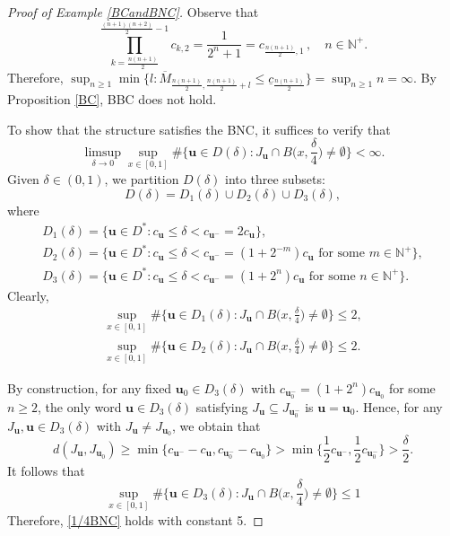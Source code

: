\documentclass[12pt]{amsart}
\numberwithin{equation}{section}
\theoremstyle{plain}
\theoremstyle{remark}
\theoremstyle{definition}
\newcommand{\om}{\overline{M}}
\newcommand{\N}{\mathbb{N}}
\newcommand{\bu}{\mathbf{u}}
\newcommand{\de}{\delta}
\newcommand{\f}{\frac}
\newcommand{\uc}{\underline{c}}
\renewcommand{\ge}{\geqslant}
\renewcommand{\le}{\leqslant}
\begin{document}
	
	\begin{proof}[Proof of Example \ref{BCandBNC}]
	Observe that
		\[
		\prod_{k=\f{n(n+1)}2}^{\f{(n+1)(n+2)}2-1}c_{k,2}=\f{1}{2^n+1}=c_{\f{n(n+1)}2,1}\,,\quad n\in \N^+.
		\]
		Therefore,
$\sup_{n\ge 1}\min  \{l:\om_{\f{n(n+1)}2,\f{n(n+1)}2+l}\le\uc_{\f{n(n+1)}2}\}=\sup_{n\ge 1} n=\infty.$ By Proposition \ref{BC}, BBC does not hold.
		
		To show that the structure satisfies the BNC, it suffices to verify that
		\begin{equation}\label{1/4BNC}
			\limsup_{\de\to 0}\sup_{x\in [0,1]}\# \Big\{\bu\in D(\de):J_{\bu}\cap B\big(x,\f\de4\big)\neq \emptyset \Big\}<\infty.
		\end{equation}
		Given $\de\in (0,1)$, we partition $D(\de)$ into three subsets:
		$$D(\de)=D_1(\de)\cup D_2(\de)\cup D_3(\de),$$ where
		\begin{gather*}
			D_1(\de)=\big\{\bu\in D^*:c_\bu\le \de<c_{\bu^-}=2c_\bu\big\},\\
			D_2(\de)=\big\{\bu\in D^*:c_\bu\le \de<c_{\bu^-}=(1+2^{-m})c_\bu\text{\ for some\ }m\in \N^+\big\},\\
			D_3(\de)=\big\{\bu\in D^*:c_\bu\le \de<c_{\bu^-}=(1+2^{n})c_\bu\text{\ for some\ }n\in \N^+\big\}.
		\end{gather*}
		Clearly,
		\begin{gather*}
			\sup_{x\in [0,1]}\#\Big\{\bu\in D_1(\de):J_\bu\cap B\big(x,\f\de4\big)\neq \emptyset\Big\}\le 2,\\
			\sup_{x\in [0,1]}\#\Big\{\bu\in D_2(\de):J_\bu\cap B\big(x,\f\de4\big)\neq \emptyset\Big\}\le 2.
		\end{gather*}
		
		By construction, for any fixed $\bu_0\in D_3(\de)$ with $c_{\bu_0^-} = (1 + 2^{n})c_{\bu_0}$ for some $n\ge 2$, the only word $\bu\in D_3(\de)$ satisfying $J_{\bu}\subseteq J_{\bu_0^-}$ is $\bu=\bu_0$. Hence, for any $J_\bu,\bu\in D_3(\de)$ with $J_\bu\neq J_{\bu_0}$, we obtain that
		\[
		d(J_{\bu},J_{\bu_0})\ge \min\{c_{\bu^-}-c_{\bu},c_{\bu_0^-}-c_{\bu_0}\}>\min\Big\{\f12c_{\bu^-},\f12c_{\bu_0^-}\Big\}>\f\de2.
		\]
		It follows that
		\[
		\sup_{x\in [0,1]}\#\big\{\bu\in D_3(\de):J_\bu\cap B\big(x,\f\de4\big)\neq \emptyset\big\}\le 1
		\] 
		Therefore, \eqref{1/4BNC} holds with constant 5.
	\end{proof}
	
	
	
\end{document}
